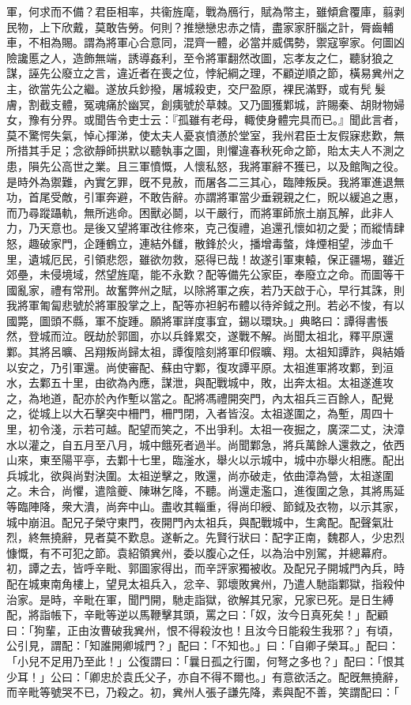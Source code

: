 \begin{pinyinscope}
軍，何求而不備？君臣相率，共衞旌麾，戰為鴈行，賦為幣主，雖傾倉覆庫，翦剥民物，上下欣戴，莫敢告勞。何則？推戀戀忠赤之情，盡家家肝腦之計，脣齒輔車，不相為賜。謂為將軍心合意同，混齊一體，必當并威偶勢，禦寇寧家。何圖凶險讒慝之人，造飾無端，誘導姦利，至令將軍翻然改圖，忘孝友之仁，聽豺狼之謀，誣先公廢立之言，違近者在喪之位，悖紀綱之理，不顧逆順之節，橫易兾州之主，欲當先公之繼。遂放兵鈔撥，屠城殺吏，交尸盈原，裸民滿野，或有髠𩮜髮膚，割截支體，冤魂痛於幽冥，創痍號於草棘。又乃圖獲鄴城，許賜秦、胡財物婦女，豫有分界。或聞告令吏士云：『孤雖有老母，輙使身體完具而已。』聞此言者，莫不驚愕失氣，悼心揮涕，使太夫人憂哀憤懣於堂室，我州君臣士友假寐悲歎，無所措其手足；念欲靜師拱默以聽執事之圖，則懼違春秋死命之節，貽太夫人不測之患，隕先公高世之業。且三軍憤慨，人懷私怒，我將軍辭不獲已，以及館陶之役。是時外為禦難，內實乞罪，旣不見赦，而屠各二三其心，臨陣叛戾。我將軍進退無功，首尾受敵，引軍奔避，不敢告辭。亦謂將軍當少垂親親之仁，貺以緩追之惠，而乃尋蹤躡軌，無所逃命。困獸必鬬，以干嚴行，而將軍師旅土崩瓦解，此非人力，乃天意也。是後又望將軍改往修來，克己復禮，追還孔懷如初之愛；而縱情肆怒，趣破家門，企踵鶴立，連結外讎，散鋒於火，播增毒螫，烽煙相望，涉血千里，遺城厄民，引領悲怨，雖欲勿救，惡得已哉！故遂引軍東轅，保正疆埸，雖近郊壘，未侵境域，然望旌麾，能不永歎？配等備先公家臣，奉廢立之命。而圖等干國亂家，禮有常刑。故奮弊州之賦，以除將軍之疾，若乃天啟于心，早行其誅，則我將軍匍匐悲號於將軍股掌之上，配等亦袒躬布體以待斧鉞之刑。若必不悛，有以國斃，圖頭不縣，軍不旋踵。願將軍詳度事宜，錫以環玦。」典略曰：譚得書悵然，登城而泣。旣劫於郭圖，亦以兵鋒累交，遂戰不解。尚聞太祖北，釋平原還鄴。其將呂曠、呂翔叛尚歸太祖，譚復陰刻將軍印假曠、翔。太祖知譚詐，與結婚以安之，乃引軍還。尚使審配、蘇由守鄴，復攻譚平原。太祖進軍將攻鄴，到洹水，去鄴五十里，由欲為內應，謀泄，與配戰城中，敗，出奔太祖。太祖遂進攻之，為地道，配亦於內作塹以當之。配將馮禮開突門，內太祖兵三百餘人，配覺之，從城上以大石擊突中柵門，柵門閉，入者皆沒。太祖遂圍之，為塹，周四十里，初令淺，示若可越。配望而笑之，不出爭利。太祖一夜掘之，廣深二丈，決漳水以灌之，自五月至八月，城中餓死者過半。尚聞鄴急，將兵萬餘人還救之，依西山來，東至陽平亭，去鄴十七里，臨滏水，舉火以示城中，城中亦舉火相應。配出兵城北，欲與尚對決圍。太祖逆擊之，敗還，尚亦破走，依曲漳為營，太祖遂圍之。未合，尚懼，遣陰夔、陳琳乞降，不聽。尚還走濫口，進復圍之急，其將馬延等臨陣降，衆大潰，尚奔中山。盡收其輜重，得尚印綬、節鉞及衣物，以示其家，城中崩沮。配兄子榮守東門，夜開門內太祖兵，與配戰城中，生禽配。配聲氣壯烈，終無撓辭，見者莫不歎息。遂斬之。先賢行狀曰：配字正南，魏郡人，少忠烈慷慨，有不可犯之節。袁紹領兾州，委以腹心之任，以為治中別駕，并總幕府。初，譚之去，皆呼辛毗、郭圖家得出，而辛評家獨被收。及配兄子開城門內兵，時配在城東南角樓上，望見太祖兵入，忿辛、郭壞敗兾州，乃遣人馳詣鄴獄，指殺仲治家。是時，辛毗在軍，聞門開，馳走詣獄，欲解其兄家，兄家已死。是日生縛配，將詣帳下，辛毗等逆以馬鞭擊其頭，罵之曰：「奴，汝今日真死矣！」配顧曰：「狗輩，正由汝曹破我兾州，恨不得殺汝也！且汝今日能殺生我邪？」有頃，公引見，謂配：「知誰開卿城門？」配曰：「不知也。」曰：「自卿子榮耳。」配曰：「小兒不足用乃至此！」公復謂曰：「曩日孤之行圍，何弩之多也？」配曰：「恨其少耳！」公曰：「卿忠於袁氏父子，亦自不得不爾也。」有意欲活之。配旣無撓辭，而辛毗等號哭不已，乃殺之。初，兾州人張子謙先降，素與配不善，笑謂配曰：「
\end{pinyinscope}
